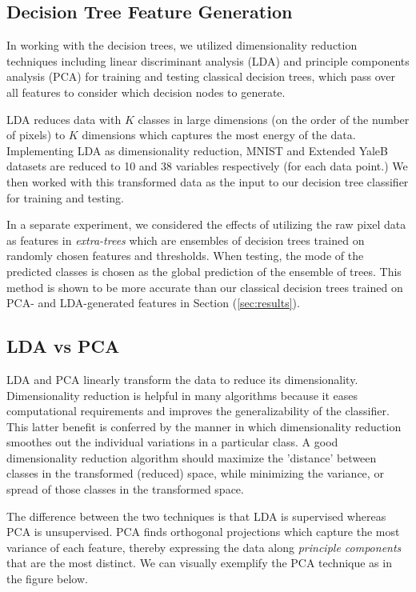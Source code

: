 \subsection{Decision Tree Feature Generation}

In working with the decision trees, we utilized dimensionality reduction techniques including linear discriminant analysis (LDA) and principle components analysis (PCA) for training and testing classical decision trees, which pass over all features to consider which decision nodes to generate. 

LDA reduces data with $K$ classes in large dimensions (on the order of the number of pixels) to 
$K$ dimensions which captures the most energy of the data. Implementing LDA as dimensionality reduction, MNIST and Extended YaleB datasets are reduced to 10 and 38 variables respectively (for each data point.) We then worked with this transformed data as the input to our decision tree classifier for training and testing.

In a separate experiment, we considered the effects of utilizing the raw pixel data as features in \emph{extra-trees} which are ensembles of decision trees trained on randomly chosen features and thresholds. When testing, the mode of the predicted classes is chosen as the global prediction of the ensemble of trees. This method is shown to be more accurate than our classical decision trees trained on PCA- and LDA-generated features in Section (\ref{sec:results}).

\subsection{LDA vs PCA}

LDA and PCA linearly transform the data to reduce its dimensionality. Dimensionality reduction is helpful in many algorithms because it eases computational requirements and improves the generalizability of the classifier. This latter benefit is conferred by the manner in which dimensionality reduction smoothes out the individual variations in a particular class. A good dimensionality reduction algorithm should maximize the 'distance' between classes in the transformed (reduced) space, while minimizing the variance, or spread of those classes in the transformed space. 

The difference between the two techniques is that LDA is supervised whereas PCA is unsupervised. PCA finds orthogonal projections which capture the most variance of each feature, thereby expressing the data along \emph{principle components} that are the most distinct. We can visually exemplify the PCA technique as in the figure below. 

